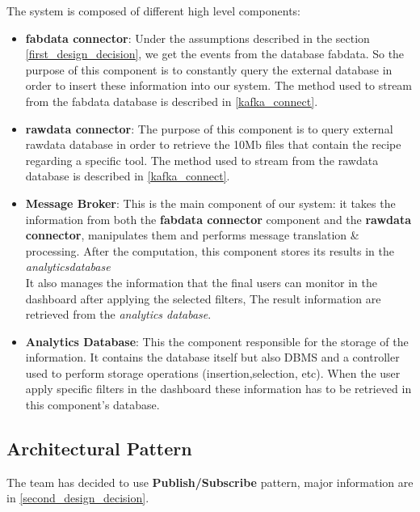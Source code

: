 The system is composed of different high level components:
\begin{itemize}
    \item \textbf{fab\textunderscore data connector}: Under the assumptions described in the section \ref{first_design_decision}, we get the events from the database fab\textunderscore data. So the purpose of this component is to constantly query the external database in order to insert these information into our system. The method used to stream from the fab\textunderscore data database is described in \ref{kafka_connect}.
    
    \item \textbf{raw\textunderscore data connector}: The purpose of this component is to query external raw\textunderscore data database in order to retrieve the 10Mb files that contain the recipe regarding a specific tool. The method used to stream from the raw\textunderscore data database is described in \ref{kafka_connect}.
    
    \item \textbf{Message Broker}: This is the main component of our system: it takes the information from  both the \textbf{fab\textunderscore data connector} component and the \textbf{raw\textunderscore data connector}, manipulates them and performs message translation \& processing.  After the computation, this component stores its results in the \textit{analytics\textunderscore database}\\
    It also manages the information that the final users can monitor in the dashboard after applying the selected filters, The result information are retrieved from the \textit{analytics database}.
    
    \item \textbf{Analytics Database}: This the component responsible for the storage of the information. It contains the database itself but also DBMS and a controller used to perform storage operations (insertion,selection, etc). When the user apply specific filters in the dashboard these information has to be retrieved in this component's database.
\end{itemize}

\subsection{Architectural Pattern}
The team has decided to use \textbf{Publish/Subscribe} pattern, major information are in \ref{second_design_decision}.

